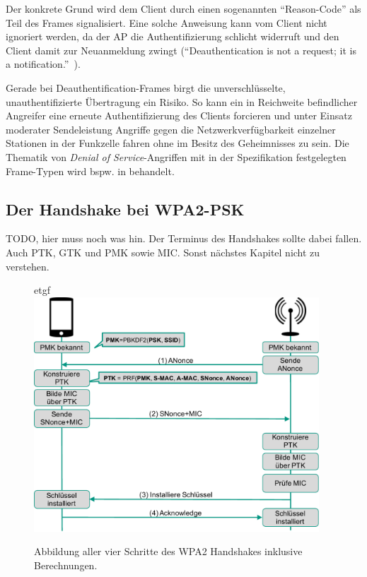 Der konkrete Grund wird dem Client durch einen sogenannten \enquote{Reason-Code} als Teil des Frames signalisiert. Eine solche Anweisung kann vom Client nicht ignoriert werden, da der AP die Authentifizierung schlicht widerruft und den Client damit zur Neuanmeldung zwingt (\enquote{Deauthentication is not a request; it is a notification.}~\cite[S. 74]{ieee802.11}).
 
Gerade bei Deauthentification-Frames birgt die unverschlüsselte, unauthentifizierte Übertragung ein Risiko.
So kann ein in Reichweite befindlicher Angreifer eine erneute Authentifizierung des Clients forcieren und unter Einsatz moderater Sendeleistung Angriffe gegen die Netzwerkverfügbarkeit einzelner Stationen in der Funkzelle fahren ohne im Besitz des Geheimnisses zu sein. Die Thematik von \textit{Denial of Service}-Angriffen mit in der Spezifikation festgelegten Frame-Typen wird bspw. in \cite{bernaschi2008access} behandelt.

\subsection{Der Handshake bei WPA2-PSK}\label{subs:handshake}
TODO, hier muss noch was hin. Der Terminus des Handshakes sollte dabei fallen. Auch PTK, GTK und PMK sowie MIC. Sonst nächstes Kapitel nicht zu verstehen.

\begin{figure}[ht]
	\centering
etgf	\includegraphics[width=0.95\textwidth]{graphics/wpa2handshake}
	\caption[Deauthentication-Frame]{Abbildung aller vier Schritte des WPA2 Handshakes inklusive Berechnungen.}
	\label{fig:wpa2handshake}
\end{figure}

\FloatBarrier